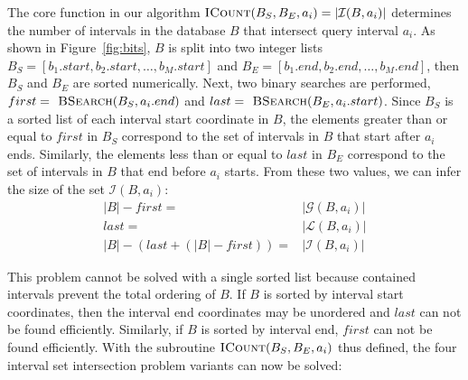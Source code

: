\documentclass{bioinfo}
\begin{document}
	The core function in our algorithm 
	$\textsc{ICount}(B_S,B_E,a_i) = |\mathcal{I}(B,a_i)|$ determines the number of
	intervals in the database $B$ that intersect query interval $a_i$.  As shown in
	Figure~\ref{fig:bits}, $B$ is split into two integer lists 
	$B_S = [b_1.start, b_2.start, \dots, b_M.start]$ and 
	$B_E = [b_1.end, b_2.end, \dots, b_M.end]$, then $B_S$ and $B_E$ are sorted
	numerically.  Next, two binary searches are performed,
	$first=\textsc{ BSearch}(B_S, a_i.end)$ and 
	$last=\textsc{ BSearch}(B_E,
	a_i.start)$.  Since $B_S$ is a sorted list of each interval start coordinate in
	$B$, the elements greater than or equal to $first$ in $B_S$ correspond to the
	set of intervals in $B$ that start after $a_i$ ends.  Similarly, the elements
	less than or equal to $last$ in $B_E$ correspond to the set of intervals in $B$
	that end before $a_i$ starts.  From these two values, we can infer the size of
	the set $\mathcal{I}(B,a_i)$:
	\begin{equation*}
		\begin{split}
			|B|-first=&|\mathcal{G}(B,a_i)| \\
			last=&|\mathcal{L}(B,a_i)| \\ 
			|B|-(last+(|B|-first))=&|\mathcal{I}(B,a_i)|
		\end{split}
	\end{equation*}

	This problem cannot be solved with a single sorted list because
	contained intervals prevent the total ordering of $B$.  If $B$ is
	sorted by interval start coordinates, then the interval end
	coordinates may be unordered and $last$ can not be found
	efficiently.  Similarly, if $B$ is sorted by interval end,
	$first$ can not be found efficiently.  With the subroutine
	$\textsc{ICount}(B_S,B_E,a_i)$ thus defined, the four interval set intersection
	problem variants can now be solved:
\end{document}
